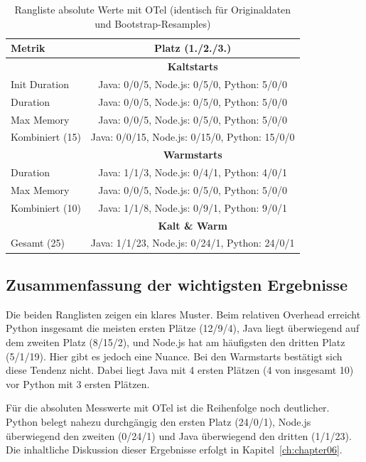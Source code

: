 \begin{table}[H]
\centering
\footnotesize
\setlength{\tabcolsep}{8pt}
\caption{Rangliste absolute Werte mit OTel (identisch für Originaldaten und Bootstrap-Resamples)}
\label{res:ranking-with-otel}
\begin{tabular}{|l|c|}
\hline
\textbf{Metrik} & \textbf{Platz (1./2./3.)} \\
\hline
& \textbf{Kaltstarts} \\
\hline
Init Duration & Java: 0/0/5, Node.js: 0/5/0, Python: 5/0/0 \\
\hline
Duration & Java: 0/0/5, Node.js: 0/5/0, Python: 5/0/0 \\
\hline
Max Memory & Java: 0/0/5, Node.js: 0/5/0, Python: 5/0/0 \\
\hline
Kombiniert (15) & Java: 0/0/15, Node.js: 0/15/0, Python: 15/0/0 \\
\hline
& \textbf{Warmstarts} \\
\hline
Duration & Java: 1/1/3, Node.js: 0/4/1, Python: 4/0/1 \\
\hline
Max Memory & Java: 0/0/5, Node.js: 0/5/0, Python: 5/0/0 \\
\hline
Kombiniert (10) & Java: 1/1/8, Node.js: 0/9/1, Python: 9/0/1 \\
\hline
& \textbf{Kalt \& Warm} \\
\hline
Gesamt (25) & Java: 1/1/23, Node.js: 0/24/1, Python: 24/0/1 \\
\hline
\end{tabular}
\end{table}

\subsection{Zusammenfassung der wichtigsten Ergebnisse}
Die beiden Ranglisten zeigen ein klares Muster. Beim relativen Overhead erreicht Python insgesamt die meisten ersten Plätze (12/9/4), 
Java liegt überwiegend auf dem zweiten Platz (8/15/2), und Node.js hat am häufigsten den dritten Platz 
(5/1/19). Hier gibt es jedoch eine Nuance. Bei den Warmstarts bestätigt sich diese Tendenz nicht. 
Dabei liegt Java mit 4 ersten Plätzen (4 von insgesamt 10) vor Python mit 3 ersten Plätzen.

Für die absoluten Messwerte mit OTel ist die Reihenfolge noch deutlicher. Python belegt nahezu durchgängig den ersten Platz 
(24/0/1), Node.js überwiegend den zweiten (0/24/1) und Java überwiegend den dritten (1/1/23). Die inhaltliche Diskussion dieser 
Ergebnisse erfolgt in Kapitel~\ref{ch:chapter06}.

